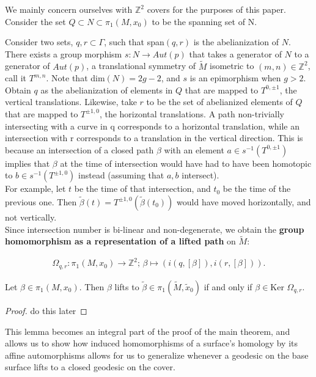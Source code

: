 \documentclass[]{article}
\begin{document}
We mainly concern ourselves with $\mathbb{Z}^2$ covers for the purposes of this paper. Consider the set $Q\subset N\subset \pi_1(M,x_0)$ to be the spanning set of N. 

\begin{Def}
Consider two sets, $q,r\subset\Gamma$, such that span$(q,r)$ is the abelianization of $N$. There exists a group morphism $s:N\rightarrow Aut(p)$ that takes a generator of $N$ to a generator of $Aut(p)$, a translational symmetry of $\tilde{M}$ isometric to $(m,n)\in\mathbb{Z}^2$, call it $T^{m,n}$. Note that dim$(N)=2g-2$, and $s$ is an epimorphism when $g>2$. Obtain $q$ as the abelianization of elements in $Q$ that are mapped to $T^{0,\pm 1}$, the vertical translations. Likewise, take $r$ to be the set of abelianized elements of $Q$ that are mapped to  $T^{\pm 1, 0}$, the horizontal translations. A path non-trivially intersecting with a curve in q corresponds to a horizontal translation, while an intersection with r corresponds to a translation in the vertical direction. This is because an intersection of a closed path $\beta$ with an element $a \in s^{-1}(T^{0,\pm 1})$ implies that $\beta$ at the time of intersection would have had to have been homotopic to $b\in s^{-1}(T^{\pm 1,0})$ instead (assuming that $a,b$ intersect).\\
For example, let $t$ be the time of that intersection, and $t_0$ be the time of the previous one. Then $\tilde{\beta}(t)=T^{\pm 1,0}(\tilde{\beta}(t_0))$ would have moved horizontally, and not vertically.\\
Since intersection number is bi-linear and non-degenerate, we   obtain the \textbf{group homomorphism as a representation of a lifted path} on $\tilde{M}$:

\begin{align*}
\Omega_{q,r}:\pi_1(M,x_0)\rightarrow \mathbb{Z}^2 \text{; } \beta\mapsto(i(q,[\beta]),i(r,[\beta])).
\end{align*}
\end{Def} 

\begin{lem}
Let $\beta\in\pi_1(M,x_0)$. Then $\beta$ lifts to $\tilde{\beta}\in\pi_1(\tilde{M},\tilde{x}_0)$ if and only if $\beta\in\text{Ker }\Omega_{q,r}$.
\begin{proof}
do this later
\end{proof}
\end{lem}

This lemma becomes an integral part of the proof of the main theorem, and allows us to show how induced homomorphisms of a surface's homology by its affine automorphisms allows for us to generalize whenever a geodesic on the base surface lifts to a closed geodesic on the cover. 
\end{document}
